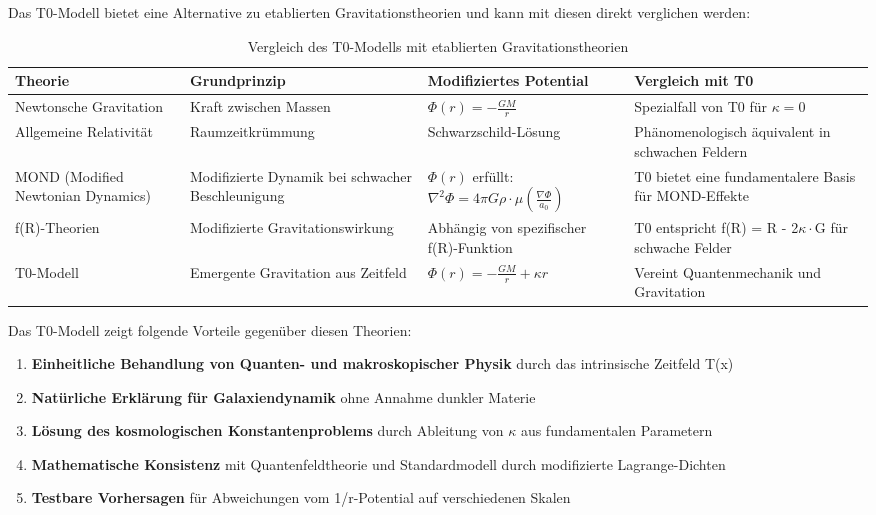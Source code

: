 \documentclass[12pt,a4paper]{article}
\begin{document}
Das T0-Modell bietet eine Alternative zu etablierten Gravitationstheorien und kann mit diesen direkt verglichen werden:

\begin{table}[H]
	\centering
	\begin{tabular}{p{3cm}p{3cm}p{4cm}p{4cm}}
		\toprule
		\textbf{Theorie} & \textbf{Grundprinzip} & \textbf{Modifiziertes Potential} & \textbf{Vergleich mit T0} \\
		\midrule
		Newtonsche Gravitation & Kraft zwischen Massen & $\Phi(r) = -\frac{GM}{r}$ & Spezialfall von T0 für $\kappa=0$ \\
		Allgemeine Relativität & Raumzeitkrümmung & Schwarzschild-Lösung & Phänomenologisch äquivalent in schwachen Feldern \\
		MOND (Modified Newtonian Dynamics) & Modifizierte Dynamik bei schwacher Beschleunigung & $\Phi(r)$ erfüllt: $\nabla^2\Phi = 4\pi G\rho\cdot\mu(\frac{\nabla\Phi}{a_0})$ & T0 bietet eine fundamentalere Basis für MOND-Effekte \\
		f(R)-Theorien & Modifizierte Gravitationswirkung & Abhängig von spezifischer f(R)-Funktion & T0 entspricht f(R) = R - 2$\kappa\cdot$G für schwache Felder \\
		T0-Modell & Emergente Gravitation aus Zeitfeld & $\Phi(r) = -\frac{GM}{r} + \kappa r$ & Vereint Quantenmechanik und Gravitation \\
		\bottomrule
	\end{tabular}
	\caption{Vergleich des T0-Modells mit etablierten Gravitationstheorien}
	\label{tab:vergleich_theorien}
\end{table}

Das T0-Modell zeigt folgende Vorteile gegenüber diesen Theorien:

\begin{enumerate}
	\item \textbf{Einheitliche Behandlung von Quanten- und makroskopischer Physik} durch das intrinsische Zeitfeld T(x)
	\item \textbf{Natürliche Erklärung für Galaxiendynamik} ohne Annahme dunkler Materie
	\item \textbf{Lösung des kosmologischen Konstantenproblems} durch Ableitung von $\kappa$ aus fundamentalen Parametern
	\item \textbf{Mathematische Konsistenz} mit Quantenfeldtheorie und Standardmodell durch modifizierte Lagrange-Dichten
	\item \textbf{Testbare Vorhersagen} für Abweichungen vom 1/r-Potential auf verschiedenen Skalen
\end{enumerate}
\end{document}
